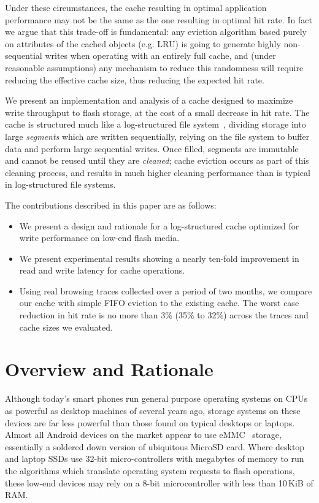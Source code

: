\documentclass[letterpaper,twocolumn,10pt]{article}
\begin{document}
Under these circumstances, the cache resulting in optimal application
performance may not be the same as the one resulting in optimal hit
rate. In fact we argue that this trade-off is fundamental: any
eviction algorithm based purely on attributes of the cached objects
(e.g. LRU) is going to generate highly non-sequential writes when
operating with an entirely full cache, and (under reasonable
assumptions) any mechanism to reduce this randomness will require
reducing the effective cache size, thus reducing the expected hit rate.

We present an implementation and analysis of a cache designed to maximize write
throughput to flash storage, at the cost of a small decrease in hit rate. The
cache is structured much like a log-structured file system~\cite{rosenblum92},
dividing storage into large \emph{segments} which are written
sequentially, relying on the file system to buffer data and perform
large sequential writes. 
Once filled, segments are immutable and cannot be reused until they are
\emph{cleaned}; cache eviction occurs as part of this cleaning
process, and results in much higher cleaning performance than is
typical in log-structured file systems.

The contributions described in this paper are as follows:

\begin{itemize}

  \item We present a design and rationale for a log-structured cache optimized
    for write performance on low-end flash media.

  \item We present experimental results showing a nearly ten-fold improvement in
    read and write latency for cache operations.

  \item Using real browsing traces collected over a period of two months, we
    compare our cache with simple FIFO eviction to the existing cache.  The
    worst case reduction in hit rate is no more than 3\% (35\% to 32\%) across
    the traces and cache sizes we evaluated.

\end{itemize}

\section{Overview and Rationale}
Although today's smart phones run general purpose operating systems on CPUs as
powerful as desktop machines of several years ago, storage systems on these
devices are far less powerful than those found on typical desktops or laptops.
Almost all Android devices on the market appear to use eMMC~\cite{emmc_2010}
storage, essentially a soldered down version of ubiquitous MicroSD card.  Where
desktop and laptop SSDs use 32-bit micro-controllers with megabytes of memory to
run the algorithms which translate operating system requests to flash
operations, these low-end devices may rely on a 8-bit microcontroller with less
than 10\,KiB of RAM.
\end{document}
